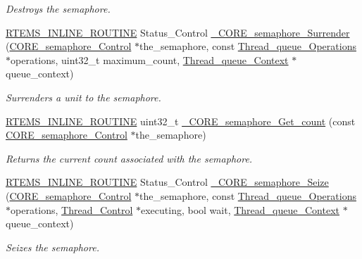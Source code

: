 \begin{DoxyCompactItemize}
\begin{DoxyCompactList}\small\item\em Destroys the semaphore. \end{DoxyCompactList}\item 
\mbox{\hyperlink{group__RTEMSScoreBaseDefs_gac216239df231d5dbd15e3520b0b9313f}{R\+T\+E\+M\+S\+\_\+\+I\+N\+L\+I\+N\+E\+\_\+\+R\+O\+U\+T\+I\+NE}} Status\+\_\+\+Control \mbox{\hyperlink{group__RTEMSScoreSemaphore_ga77394f444e0a86af7eae34891fe96578}{\+\_\+\+C\+O\+R\+E\+\_\+semaphore\+\_\+\+Surrender}} (\mbox{\hyperlink{structCORE__semaphore__Control}{C\+O\+R\+E\+\_\+semaphore\+\_\+\+Control}} $\ast$the\+\_\+semaphore, const \mbox{\hyperlink{structThread__queue__Operations}{Thread\+\_\+queue\+\_\+\+Operations}} $\ast$operations, uint32\+\_\+t maximum\+\_\+count, \mbox{\hyperlink{structThread__queue__Context}{Thread\+\_\+queue\+\_\+\+Context}} $\ast$queue\+\_\+context)
\begin{DoxyCompactList}\small\item\em Surrenders a unit to the semaphore. \end{DoxyCompactList}\item 
\mbox{\hyperlink{group__RTEMSScoreBaseDefs_gac216239df231d5dbd15e3520b0b9313f}{R\+T\+E\+M\+S\+\_\+\+I\+N\+L\+I\+N\+E\+\_\+\+R\+O\+U\+T\+I\+NE}} uint32\+\_\+t \mbox{\hyperlink{group__RTEMSScoreSemaphore_ga12f8321a13d1cf462709e2ff79cd68d9}{\+\_\+\+C\+O\+R\+E\+\_\+semaphore\+\_\+\+Get\+\_\+count}} (const \mbox{\hyperlink{structCORE__semaphore__Control}{C\+O\+R\+E\+\_\+semaphore\+\_\+\+Control}} $\ast$the\+\_\+semaphore)
\begin{DoxyCompactList}\small\item\em Returns the current count associated with the semaphore. \end{DoxyCompactList}\item 
\mbox{\hyperlink{group__RTEMSScoreBaseDefs_gac216239df231d5dbd15e3520b0b9313f}{R\+T\+E\+M\+S\+\_\+\+I\+N\+L\+I\+N\+E\+\_\+\+R\+O\+U\+T\+I\+NE}} Status\+\_\+\+Control \mbox{\hyperlink{group__RTEMSScoreSemaphore_ga7b6f46a1b1493871428be3b274ebb0f0}{\+\_\+\+C\+O\+R\+E\+\_\+semaphore\+\_\+\+Seize}} (\mbox{\hyperlink{structCORE__semaphore__Control}{C\+O\+R\+E\+\_\+semaphore\+\_\+\+Control}} $\ast$the\+\_\+semaphore, const \mbox{\hyperlink{structThread__queue__Operations}{Thread\+\_\+queue\+\_\+\+Operations}} $\ast$operations, \mbox{\hyperlink{struct__Thread__Control}{Thread\+\_\+\+Control}} $\ast$executing, bool wait, \mbox{\hyperlink{structThread__queue__Context}{Thread\+\_\+queue\+\_\+\+Context}} $\ast$queue\+\_\+context)
\begin{DoxyCompactList}\small\item\em Seizes the semaphore. \end{DoxyCompactList}\end{DoxyCompactItemize}


